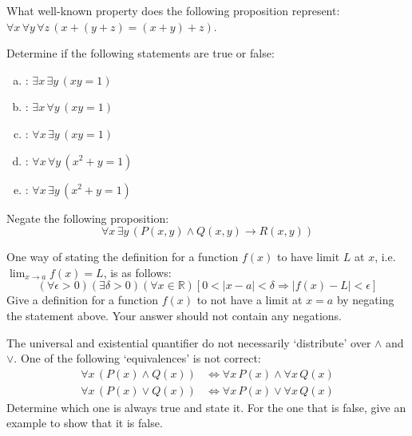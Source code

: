 \documentclass[11pt,letterpaper]{article}
\begin{document}
\newpage



 What well-known property does the following proposition represent: $\forall x\, \forall y\, \forall z\, (x + (y + z) = (x + y) + z)$.




\newpage



 Determine if the following statements are true or false:
	\begin{enumerate}[(a)]
	\item \uans{1.5cm}: $\exists x\, \exists y\, (xy = 1)$
	\item \uans{1.5cm}: $\exists x\, \forall y\, (xy= 1)$
	\item \uans{1.5cm}: $\forall x\, \exists y\, (xy= 1)$
	\item \uans{1.5cm}: $\forall x\, \forall y\, (x^2 + y = 1)$
	\item \uans{1.5cm}: $\forall x\, \exists y\, (x^2 + y= 1)$
	\end{enumerate}



\newpage



 Negate the following proposition:
	\[
	\forall x\, \exists y\, \left( P(x,y) \wedge Q(x,y) \to R(x,y) \right)
	\]



\newpage



 One way of stating the definition for a function $f(x)$ to have limit $L$ at $x$, i.e. $\displaystyle \lim_{x \to a} f(x)= L$, is as follows:
	\[
	(\forall \epsilon > 0)(\exists \delta > 0)(\forall x \in \mathbb{R})[ 0 < |x - a| < \delta \Rightarrow |f(x) - L| < \epsilon]
	\]
Give a definition for a function $f(x)$ to not have a limit at $x= a$ by negating the statement above. Your answer should not contain any negations. 



\newpage



 The universal and existential quantifier do not necessarily `distribute' over $\wedge$ and $\vee$. One of the following `equivalences' is not correct:
	\[
	\begin{aligned}
	\forall x\, (P(x) \wedge Q(x)) &\Longleftrightarrow \forall x\, P(x) \wedge \forall x\, Q(x) \\
	\forall x\, (P(x) \vee Q(x)) &\Longleftrightarrow \forall x\, P(x) \vee \forall x\, Q(x)
	\end{aligned}
	\]
Determine which one is always true and state it. For the one that is false, give an example to show that it is false. 
\end{document}
